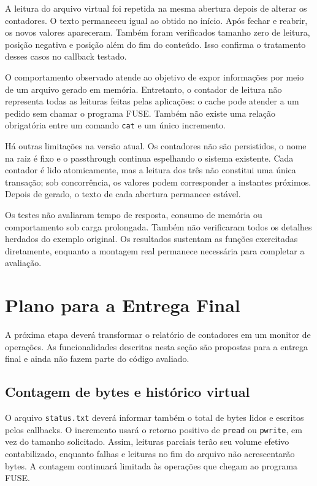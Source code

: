 \documentclass[12pt]{article}
\begin{document}
A leitura do arquivo virtual foi repetida na mesma abertura depois
de alterar os contadores. O texto permaneceu igual ao obtido no
início. Após fechar e reabrir, os novos valores apareceram. Também
foram verificados tamanho zero de leitura, posição negativa e
posição além do fim do conteúdo. Isso confirma o tratamento desses
casos no callback testado.

O comportamento observado atende ao objetivo de expor informações
por meio de um arquivo gerado em memória. Entretanto, o contador
de leitura não representa todas as leituras feitas pelas aplicações:
o cache pode atender a um pedido sem chamar o programa FUSE. Também
não existe uma relação obrigatória entre um comando \texttt{cat}
e um único incremento.

Há outras limitações na versão atual. Os contadores não são
persistidos, o nome na raiz é fixo e o passthrough continua espelhando
o sistema existente. Cada contador é lido atomicamente, mas a leitura
dos três não constitui uma única transação; sob concorrência, os
valores podem corresponder a instantes próximos. Depois de gerado,
o texto de cada abertura permanece estável.

Os testes não avaliaram tempo de resposta, consumo de memória ou
comportamento sob carga prolongada. Também não verificaram todos
os detalhes herdados do exemplo original. Os resultados sustentam
as funções exercitadas diretamente, enquanto a montagem real
permanece necessária para completar a avaliação.

\section{Plano para a Entrega Final}\label{sec:plano-final}

A próxima etapa deverá transformar o relatório de contadores em um
monitor de operações. As funcionalidades descritas nesta seção são
propostas para a entrega final e ainda não fazem parte do código avaliado.

\subsection{Contagem de bytes e histórico virtual}

O arquivo \texttt{status.txt} deverá informar também o total de bytes
lidos e escritos pelos callbacks. O incremento usará o retorno positivo
de \texttt{pread} ou \texttt{pwrite}, em vez do tamanho solicitado.
Assim, leituras parciais terão seu volume efetivo contabilizado, enquanto
falhas e leituras no fim do arquivo não acrescentarão bytes. A contagem
continuará limitada às operações que chegam ao programa FUSE.
\end{document}
